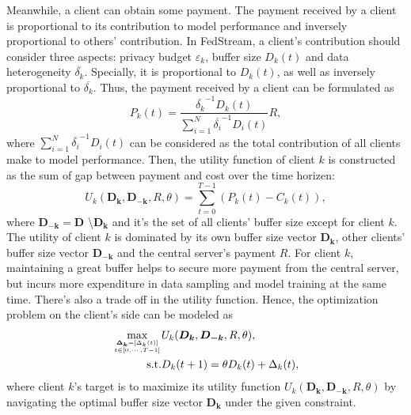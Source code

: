 \documentclass{article}
\theoremstyle{plain}
\theoremstyle{definition}
\theoremstyle{remark}
\begin{document}
Meanwhile, a client can obtain some payment.
The payment received by a client is proportional to its contribution to model performance and inversely proportional to others' contribution.
In FedStream, a client's contribution should consider three aspects: privacy budget $\varepsilon_k$, buffer size $D_k(t)$ and data heterogeneity $\overline{\delta_k}$.
Specially, it is proportional to $D_k(t)$, as well as inversely proportional to $\overline{\delta_k}$.
Thus, the payment received by a client can be formulated as
\begin{equation}
  P_k(t) = \frac{\overline{\delta_k}^{-1}D_k(t)}{\sum_{i=1}^{N}\overline{\delta_i}^{-1}D_i(t)}R,
\end{equation}
where $\sum_{i=1}^{N} \overline{\delta_i}^{-1}D_i(t)$ can be considered as the total contribution of all clients make to model performance.
Then, the utility function of client $k$ is constructed as the sum of gap between payment and cost over the time horizen:
\begin{equation}
  U_k(\boldsymbol{D_k}, \boldsymbol{D_{-k}}, R, \theta) = \sum_{t=0}^{T-1} \left(P_k(t) - C_k(t)\right),
\end{equation}
where $\boldsymbol{D_{-k}} = \boldsymbol{D}$ \textbackslash $\boldsymbol{D_k}$ and it's the set of all clients' buffer size except for client $k$. 
The utility of client $k$ is dominated by its own buffer size vector $\boldsymbol{D_k}$, other clients' buffer size vector $\boldsymbol{D_{-k}}$ and the central server's payment $R$.
For client $k$, maintaining a great buffer helps to secure more payment from the central server, but incurs more expenditure in data sampling and model training at the same time. There's also a trade off in the utility function.
Hence, the optimization problem on the client's side can be modeled as
\begin{equation}
  \begin{aligned}
    \max_{\boldsymbol{\Delta_k}=[\Delta_k(t)] \atop t \in [0,\cdots,T-1]} & U_k(\boldsymbol{D_k}, \boldsymbol{D_{-k}}, R, \theta), \\
    \text{s.t.} & D_k(t + 1) = \theta D_k(t) + \Delta_k(t),
  \end{aligned}  
\end{equation}
where client $k$'s target is to maximize its utility function $U_k(\boldsymbol{D_k}, \boldsymbol{D_{-k}}, R, \theta)$ by navigating the optimal buffer size vector $\boldsymbol{D_k}$ under the given constraint.
\end{document}

